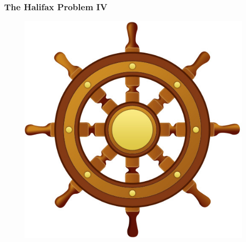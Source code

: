 \documentclass[xcolor=dvipsnames]{beamer}
\begin{document}
\begin{frame}
  \frametitle{The Halifax Problem IV}
  \begin{figure}[h]
    \includegraphics[scale=.4]{./wheel.jpg}
  \end{figure}
\end{frame}
\end{document}
